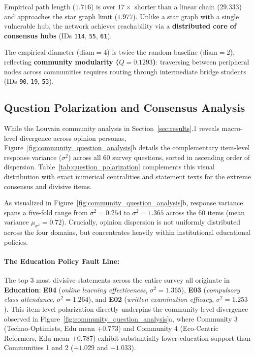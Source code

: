\documentclass[10pt,twocolumn,a4paper]{article}
\begin{document}
Empirical path length ($1.716$) is over $17\times$ shorter than a linear chain ($29.333$) and approaches the star graph limit ($1.977$). Unlike a star graph with a single vulnerable hub, the network achieves reachability via a \textbf{distributed core of consensus hubs} (IDs \texttt{114}, \texttt{55}, \texttt{61}). 

The empirical diameter ($\text{diam} = 4$) is twice the random baseline ($\text{diam} = 2$), reflecting \textbf{community modularity ($Q = 0.1293$)}: traversing between peripheral nodes across communities requires routing through intermediate bridge students (IDs \texttt{90}, \texttt{19}, \texttt{53}).



\subsection{Question Polarization and Consensus Analysis}
While the Louvain community analysis in Section~\ref{sec:results}.1 reveals macro-level divergence across opinion personas, Figure~\ref{fig:community_question_analysis}b details the complementary item-level response variance ($\sigma^2$) across all 60 survey questions, sorted in ascending order of dispersion. Table~\ref{tab:question_polarization} complements this visual distribution with exact numerical centralities and statement texts for the extreme consensus and divisive items.

As visualized in Figure~\ref{fig:community_question_analysis}b, response variance spans a five-fold range from $\sigma^2 = 0.254$ to $\sigma^2 = 1.365$ across the 60 items (mean variance $\mu_{\sigma^2} = 0.72$). Crucially, opinion dispersion is not uniformly distributed across the four domains, but concentrates heavily within institutional educational policies.

\paragraph{The Education Policy Fault Line:}
The top 3 most divisive statements across the entire survey all originate in \textbf{Education}: \textbf{E04} (\textit{online learning effectiveness}, $\sigma^2 = 1.365$), \textbf{E03} (\textit{compulsory class attendance}, $\sigma^2 = 1.264$), and \textbf{E02} (\textit{written examination efficacy}, $\sigma^2 = 1.253$). This item-level polarization directly underpins the community-level divergence observed in Figure~\ref{fig:community_question_analysis}a, where Community 3 (Techno-Optimists, Edu mean $+0.773$) and Community 4 (Eco-Centric Reformers, Edu mean $+0.787$) exhibit substantially lower education support than Communities 1 and 2 ($+1.029$ and $+1.033$).
\end{document}
